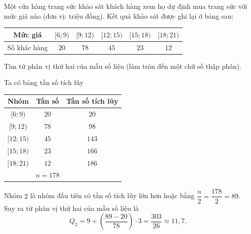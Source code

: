 \begin{ex}%
	Một cửa hàng trang sức khảo sát khách hàng xem họ dự định mua trang sức với mức giá nào (đơn vị: triệu đồng). Kết quả khảo sát được ghi lại ở bảng sau:
	\begin{center}
		\begin{tabular}{|c|c|c|c|c|c|}
			\hline Mức giá & {$[6 ; 9)$} & {$[9 ; 12)$} & {$[12 ; 15)$} & {$[15 ; 18)$} & {$[18 ; 21)$} \\
			\hline Số khác hàng & $20$ & $78$ & $45$ & $23$ & 12 \\
			\hline
		\end{tabular}
	\end{center}
	Tìm tứ phân vị thứ hai của mẫu số liệu (làm tròn đến một chữ số thập phân).
	\loigiai
	{ Ta có bảng tần số tích lũy
		\begin{center}
			\begin{tabular}{|c|c|c|}
				\hline Nhóm & Tần số & Tần số tích lũy \\
				\hline$[6 ; 9)$ & $20$ & $20$ \\
				\hline$[9 ; 12)$ & $78$ & $98$ \\
				\hline$[12 ; 15)$ & $45$ & $143$ \\
				\hline$[15 ; 18)$ & $23$ & $166$ \\
				\hline$[18 ; 21)$ & $12$ & $186$ \\
				\hline & $n=178$ & \\
				\hline
			\end{tabular}
		\end{center}
		Nhóm $2$ là nhóm đầu tiên có tần số tích lũy lớn hơn hoặc bằng $\dfrac{n}{2}=\dfrac{178}{2}=89$.\\
		Suy ra tứ phân vị thứ hai của mẫu số liệu là
		$$
		Q_2=9+\left(\dfrac{89-20}{78}\right) \cdot 3=\dfrac{303}{26}\approx 11{,}7 .
		$$
	}
\end{ex}

